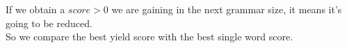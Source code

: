 	If we obtain a $score > 0$ we are gaining in the next grammar size, it means it's
	going to be reduced.\\

	So we compare the best yield score with the best single word score.

	\newpage




